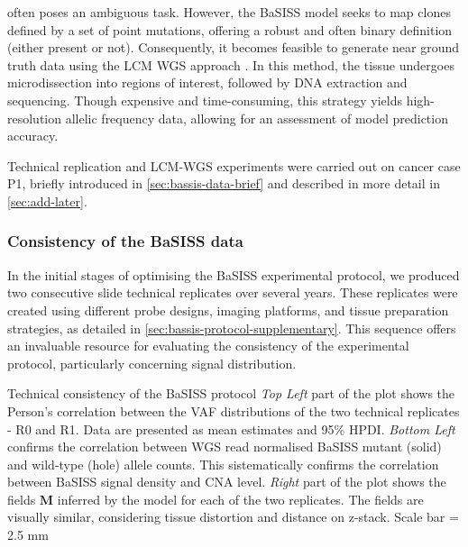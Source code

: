  often poses an ambiguous task. However, the \ac{BaSISS} model seeks to map clones defined by a set of point mutations, offering a robust and often binary definition (either present or not). Consequently, it becomes feasible to generate near ground truth data using the \ac{LCM} \ac{WGS} approach \parencite{Shen2000-xj}. In this method, the tissue undergoes microdissection into regions of interest, followed by DNA extraction and sequencing. Though expensive and time-consuming, this strategy yields high-resolution allelic frequency data, allowing for an assessment of model prediction accuracy.

Technical replication and \ac{LCM}-\ac{WGS} experiments were carried out on cancer case P1, briefly introduced in \cref{sec:bassis-data-brief} and described in more detail in \cref{sec:add-later}.

\subsubsection*{Consistency of the BaSISS data}
In the initial stages of optimising the \ac{BaSISS} experimental protocol, we produced two consecutive slide technical replicates over several years. These replicates were created using different probe designs, imaging platforms, and tissue preparation strategies, as detailed in \cref{sec:bassis-protocol-supplementary}. This sequence offers an invaluable resource for evaluating the consistency of the experimental protocol, particularly concerning signal distribution.

    {Technical consistency of the \ac{BaSISS} protocol}
    {\emph{Top Left} part of the plot shows the Person's correlation between the \ac{VAF} distributions of the two technical replicates - R0 and R1. Data are presented as mean
    estimates and 95\% HPDI. \emph{Bottom Left} confirms the correlation between \ac{WGS} read normalised \ac{BaSISS} mutant (solid) and wild-type (hole) allele counts. This sistematically confirms the correlation between \ac{BaSISS} signal density and \ac{CNA} level. \emph{Right} part of the plot shows the fields $\mathbf{M}$ inferred by the model for each of the two replicates. The fields are visually similar, considering tissue distortion and distance on z-stack. Scale bar = 2.5 mm}

